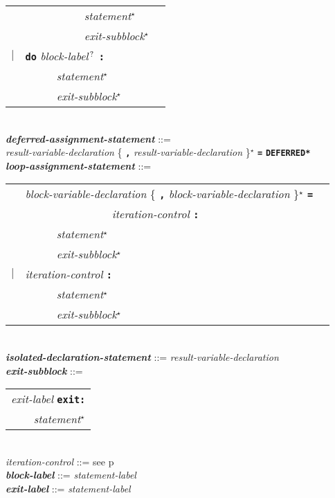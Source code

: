 \documentclass[12pt]{article}
\newcommand{\TT}[1]{{\tt \bfseries #1}}
\newcommand{\STAR}{{\Large $^\star$}}
\newcommand{\QMARK}{{$^{\,\mbox{\footnotesize ?}}$}}
\newcommand{\ttkey}[1]{{\tt \bfseries #1}}
\newcommand{\emkey}[1]{{\em \bfseries #1}}
\newcommand{\pagref}[1]{p\pageref{#1}}
\newenvironment{indpar}[1][0.3in]%
	{\begin{list}{}%
		     {\setlength{\itemsep}{0in}%
		      \setlength{\topsep}{0in}%
		      \setlength{\parsep}{1ex}%
		      \setlength{\labelwidth}{#1}%
		      \setlength{\leftmargin}{#1}%
		      \addtolength{\leftmargin}{\labelsep}}%
	 \item}%
	{\end{list}}
\begin{document}
\begin{indpar}
\begin{tabular}[t]{@{}rll}
        & ~~~~~~~~~~ {\em statement}\STAR{} \\
        & ~~~~~~~~~~ {\em exit-subblock}\STAR{} \\
    $|$ & \ttkey{do} {\em block-label}\QMARK{} \TT{:} \\
        & ~~~~~ {\em statement}\STAR{} \\
        & ~~~~~ {\em exit-subblock}\STAR{} \\
    \end{tabular}
\\[0.5ex]
\emkey{deferred-assignment-statement} ::= \\
\hspace*{0.5in}
        {\em result-variable-declaration}
	    \{ \TT{,} {\em result-variable-declaration} \}\STAR{}
	    \TT{=} \ttkey{*DEFERRED*}
\\[0.5ex]
\emkey{loop-assignment-statement} ::= \\
\hspace*{0.5in}
    \begin{tabular}[t]{@{}rll}
        & {\em block-variable-declaration}
                \{ \TT{,} {\em block-variable-declaration} \}\STAR{}
		\TT{=} \\
	& ~~~~~~~~~~~~~~~ {\em iteration-control} \TT{:} \\
        & ~~~~~ {\em statement}\STAR{} \\
        & ~~~~~ {\em exit-subblock}\STAR{} \\
    $|$ & {\em iteration-control} \TT{:} \\
        & ~~~~~ {\em statement}\STAR{} \\
        & ~~~~~ {\em exit-subblock}\STAR{} \\
    \end{tabular}
\\[0.5ex]
\emkey{isolated-declaration-statement} ::= {\em result-variable-declaration}
\\[0.5ex]
\emkey{exit-subblock} ::=
    \begin{tabular}[t]{l}
    {\em exit-label} \ttkey{exit}\TT{:} \\
    \TT{~~~~}{\em statement}\STAR{} \\
    \end{tabular}
\\[0.5ex]
{\em iteration-control} ::= see \pagref{ITERATION-CONTROL}
\\[0.5ex]
\emkey{block-label}\label{BLOCK-LABEL} ::= {\em statement-label}
\\[0.5ex]
\emkey{exit-label} ::= {\em statement-label}

\end{indpar}
\end{document}
